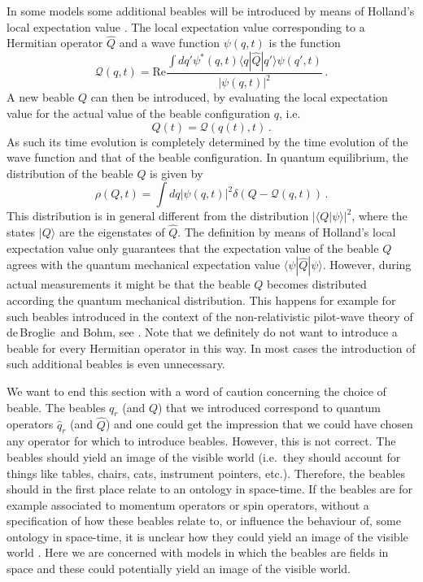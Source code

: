 \documentclass[12pt]{article}
\newcommand{\db}{de$\,$Broglie}
\begin{document}
In some models some additional beables will be introduced by means of Holland's local expectation value \cite{holland93b}. The local expectation value corresponding to a Hermitian operator ${\widehat Q}$ and a wave function $\psi(q,t)$ is the function 
\begin{equation}
{\mathcal{Q}}(q,t) = {\textrm{Re}} \frac{\int dq' \psi^*(q,t) \langle q |{\widehat Q}| q' \rangle \psi(q',t)}{ |\psi(q,t)|^2} \,.
\label{f.20.101}
\end{equation}
A new beable $Q$ can then be introduced, by evaluating the local expectation value for the actual value of the beable configuration $q$, i.e.
\begin{equation}
Q(t) = {\mathcal{Q}}(q(t),t) \,.
\label{f.20.102}
\end{equation}
As such its time evolution is completely determined by the time evolution of the wave function and that of the beable configuration. In quantum equilibrium, the distribution of the beable $Q$ is given by
\begin{equation}
\rho(Q,t) = \int dq |\psi(q,t)|^2  \delta(Q - {\mathcal{Q}}(q,t)) \,.
\label{f.20.103}
\end{equation}
This distribution is in general different from the distribution $|\langle Q | \psi \rangle|^2$, where the states $|Q\rangle$ are the eigenstates of ${\widehat Q}$. The definition by means of Holland's local expectation value only guarantees that the expectation value of the beable $Q$ agrees with the quantum mechanical expectation value $\langle \psi |{\widehat Q}| \psi \rangle$. However, during actual measurements it might be that the beable $Q$ becomes distributed according the quantum mechanical distribution. This happens for example for such beables introduced in the context of the non-relativistic pilot-wave theory of \db\ and Bohm, see \cite[pp.\ 339-347]{holland93b}. Note that we definitely do not want to introduce a beable for every Hermitian operator in this way. In most cases the introduction of such additional beables is even unnecessary.

We want to end this section with a word of caution concerning the choice of beable. The beables $q_r$ (and $Q$) that we introduced correspond to quantum operators ${\widehat q}_r$ (and ${\widehat Q}$) and one could get the impression that we could have chosen any operator for which to introduce beables. However, this is not correct. The beables should yield an image of the visible world (i.e.\ they should account for things like tables, chairs, cats, instrument pointers, etc.). Therefore, the beables should in the first place relate to an ontology in space-time. If the beables are for example associated to momentum operators or spin operators, without a specification of how these beables relate to, or influence the behaviour of, some ontology in space-time, it is unclear how they could yield an image of the visible world \cite{tumulka062}. Here we are concerned with models in which the beables are fields in space and these could potentially yield an image of the visible world. 
\end{document}
